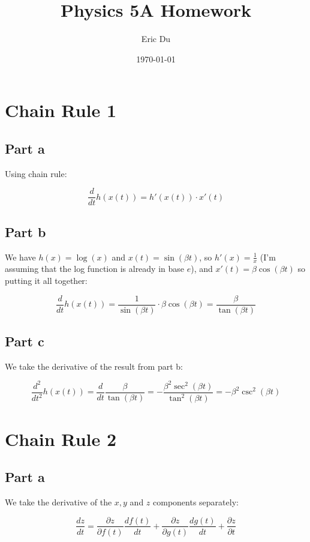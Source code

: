 \documentclass{article}
\title{Physics 5A Homework}
\author{Eric Du}
\date{\today}
\theoremstyle{definition}
\numberwithin{equation}{section}
\numberwithin{definition}{section}
\begin{document}
	\maketitle
	
	

\section{Chain Rule 1}

\subsection*{Part a}
Using chain rule:

\[ \frac{d}{dt} h(x(t)) = h'(x(t)) \cdot x'(t)\]

\subsection*{Part b}

We have $h(x) = \log(x)$ and $x(t) = \sin(\beta t)$, so $h'(x) = \frac{1}{x}$ (I'm assuming that the log function is already in base $e$), and $x'(t) = \beta \cos(\beta t)$ so putting it all together:

\[ \frac{d}{dt} h(x(t)) = \frac{1}{\sin(\beta t)} \cdot \beta \cos(\beta t) = \frac{\beta}{\tan(\beta t)}\]

\subsection{Part c}

We take the derivative of the result from part b:

\[ \frac{d^2}{dt^2} h(x(t)) = \frac{d}{dt} \frac{\beta}{\tan(\beta t)} = -\frac{\beta^2 \sec^2(\beta t)}{\tan^2 (\beta t)} = -\beta^2 \csc^2(\beta t)\]

	
\section{Chain Rule 2}

\subsection{Part a}
We take the derivative of the $x,y$ and $z$ components separately:

\[ \frac{dz}{dt} = \frac{\partial z}{\partial f(t)} \frac{df(t)}{dt} + \frac{\partial z}{\partial g(t)} \frac{dg(t)}{dt} + \frac{\partial z}{\partial t}\]
\end{document}

